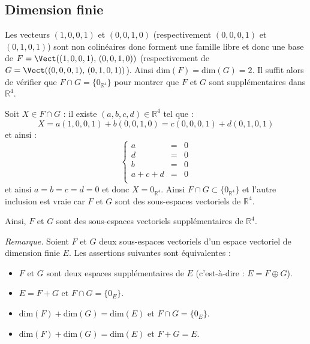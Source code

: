 \documentclass[a4paper,twoside,french,11pt]{VcCours}
\begin{document}
\subsection{Dimension finie}

\begin{Exercice}{}\end{Exercice}Les vecteurs $(1,0,0,1)$ et $(0,0,1,0)$ (respectivement $(0,0,0,1)$ et $(0,1,0,1)$) sont non colinéaires donc forment une famille libre et donc une base de $F=\Vect((1,0,0,1), \, (0,0,1,0))$ (respectivement de $G=\Vect((0,0,0,1), \, (0,1,0,1))$). Ainsi $\textrm{dim}(F)= \textrm{dim}(G)=2$. Il suffit alors de vérifier que $F \cap G = \lbrace 0_{\mathbb{R}^4} \rbrace$ pour montrer que $F$ et $G$ sont supplémentaires dans $\mathbb{R}^4$.



\noindent Soit $X \in F \cap G$ : il existe $(a,b,c,d) \in \mathbb{R}^4$ tel que :
$$ X= a(1,0,0,1) + b (0,0,1,0) = c (0,0,0,1) + d (0,1,0,1)$$
et ainsi :
$$ \left\lbrace \begin{array}{ccl}
a & = & 0 \\
d & = &0 \\
b & = & 0 \\
a+c+d & = & 0 \\
\end{array}\right. $$
et ainsi $a=b=c=d=0$ et donc $X = 0_{\mathbb{R}^4}$. Ainsi $F \cap G \subset \lbrace 0_{\mathbb{R}^4} \rbrace$ et l'autre inclusion est vraie car $F$ et $G$ sont des sous-espaces vectoriels de $\mathbb{R}^4$.



\noindent Ainsi, $F$ et $G$ sont des sous-espaces vectoriels supplémentaires de $\mathbb{R}^4$.



\noindent \textit{Remarque.} Soient $F$ et $G$ deux sous-espaces vectoriels d'un espace vectoriel de dimension finie $E$. Les assertions suivantes sont équivalentes :

\begin{itemize}
\item $F$ et $G$ sont deux espaces supplémentaires de $E$ (c'est-à-dire : $E = F \oplus G$).
\item $E= F+G$ et $F \cap G = \lbrace 0_E \rbrace$.
\item $\textrm{dim}(F) + \textrm{dim}(G) = \textrm{dim}(E)$ et  $F \cap G = \lbrace 0_E \rbrace$.
\item $\textrm{dim}(F) + \textrm{dim}(G) = \textrm{dim}(E)$ et  $F + G = E$.
\end{itemize}
\end{document}
